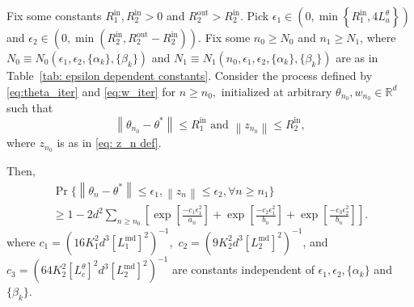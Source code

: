 \documentclass[usenames,dvipsnames,final,12pt]{colt2018} %
\newcommand{\et}{\epsilon_1}
\newcommand{\Rto}{R_1^\textrm{out}}
\newcommand{\Rti}{R_1^{\textrm{in}}}
\newcommand{\thS}{\theta^*}
\newcommand{\Kt}{K_1}
\newcommand{\LtM}{L_1^{\md}}
\newcommand{\Lt}[1]{L^{\theta}_{#1}}
\newcommand{\ez}{\epsilon_2}
\newcommand{\Rzo}{R_2^{\textrm{out}}}
\newcommand{\Rzi}{R_2^{\textrm{in}}}
\newcommand{\LzM}{L_2^{\md}}
\newcommand{\Kz}{K_2}
\newcommand{\lmin}{q_{\min}}
\newcommand{\lm}{q}
\newcommand{\md}{\text{md}}
\newcommand{\norm}[1]{\left\lVert#1\right\rVert}
\newcommand{\gal}[1]{#1}
\newcommand{\gugan}[1]{#1}
\begin{document}



\label{sec: dependencies on stepsizes}




\begin{theorem} \label{thm:condMain}
	\gugan{Fix some constants $\Rti,\Rzi > 0$ {and $\Rzo>\Rzi$}.
		Pick $\et \in \left(0,\min\left\{\Rti, 4 \Lt{a}\right\}\right)$ and $\ez \in (0,{\min(\Rzi,\Rzo-\Rzi)})$}.
	 \gal{Fix some $n_0 \geq N_0$ and $n_1 \geq N_1$, where $N_0 \equiv N_0(\et, \ez, \{\alpha_k\}, \{\beta_k\})$  and $N_1 \equiv N_1(n_0,\et,\ez,\{\alpha_k\},\{\beta_k\})$ are as in Table~\ref{tab: epsilon dependent constants}. Consider the process defined by \eqref{eq:theta_iter} and \eqref{eq:w_iter} for $n \geq n_0,$ initialized at  arbitrary $\theta_{n_0},w_{n_0} \in \mathbb{R}^d$ such that
		\begin{equation}
		\label{eq: Gn' definition}
		\norm{\theta_{n_0} - \thS} \leq \Rti \mbox{ and } \norm{z_{n_0}} \leq \Rzi,
		\end{equation}
		where $z_{n_0}$ is as in \eqref{eq: z_n def}.
	}
	Then,
	\begin{multline}
\label{eqn:ProbBound}
	\Pr
	\{
	\norm{\theta_n - \thS} \leq \et, \norm{z_n} \leq \ez, \forall n \geq n_1\}
	\\
	\geq
	1 -2d^2 \! \!
	\sum_{n \geq n_0}\left[\exp\!\left[\tfrac{-c_1 \et^2}{a_n}\right] \!
	+ \exp\!\left[\tfrac{- c_2 \et^2}{b_n}\right]\!
	+ \exp\!\left[ \tfrac{- c_3\ez^2}{b_n}\right] \right]\!.
	\end{multline}%
	where
	{
		$c_1 = (16 \Kt^2 d^3 [\LtM]^2 )^{-1},$
		$c_2 = (9 \Kz^2 d^3 [\LzM]^2)^{-1}$, and
		$c_3 = (64 \Kz^2 [\Lt{c}]^2 d^3 [\LzM]^2)^{-1}$
		are constants independent of $\et,\ez,\{\alpha_k\}$ and $\{\beta_k\}$.}
\end{theorem}
\end{document}
